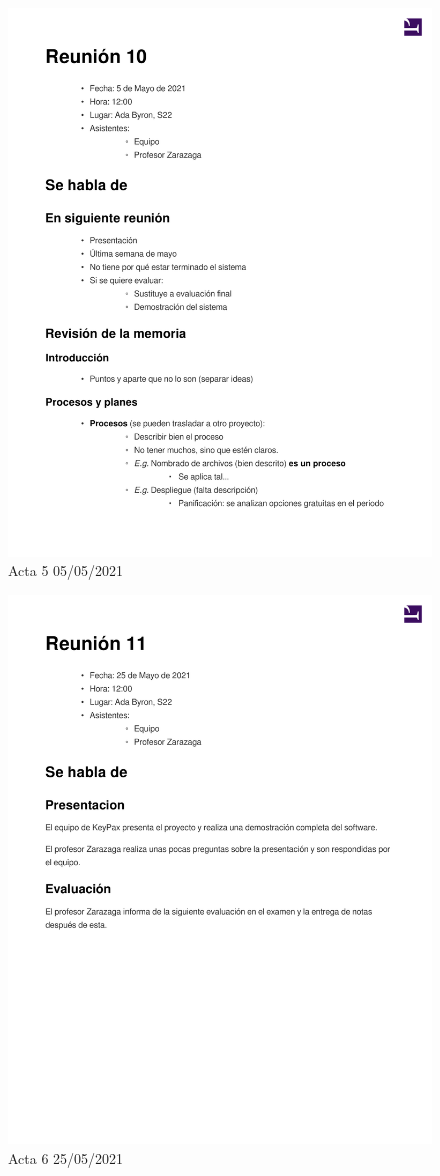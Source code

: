 \documentclass{article}
\begin{document}
\begin{figure}[H]
   \includegraphics[width=.8\textwidth]{../../actas_reuniones/2021.05.05_5_Actas.pdf}
   \caption{Acta 5 05/05/2021}
\end{figure}
\begin{figure}[H]
   \includegraphics[width=.8\textwidth]{../../actas_reuniones/2021.25.05_6_Actas.pdf}
   \caption{Acta 6 25/05/2021}
\end{figure}
\end{document}
